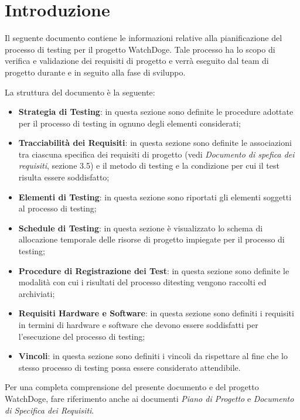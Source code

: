 \documentclass{article}
\begin{document}
\tableofcontents

\pagebreak
  
\section{Introduzione}

Il seguente documento contiene le informazioni relative alla
pianificazione del processo di testing per il progetto WatchDoge. Tale
processo ha lo scopo di verifica e validazione dei requisiti di progetto
e verrà eseguito dal team di progetto durante e in seguito alla fase di
sviluppo.

La struttura del documento è la seguente:
\begin{itemize}
\item \textbf{Strategia di Testing}: in questa sezione sono definite le procedure adottate per il processo di testing in ognuno degli elementi considerati;
\item \textbf{Tracciabilità dei Requisiti}: in questa sezione sono definite le associazioni tra ciascuna specifica dei requisiti di progetto (vedi \emph{Documento di spefica dei requisiti}, sezione 3.5) e il metodo di testing e la condizione per cui il test risulta essere soddisfatto;
\item \textbf{Elementi di Testing}: in questa sezione sono riportati gli elementi soggetti al processo di testing;
\item \textbf{Schedule di Testing}: in questa sezione è visualizzato lo schema di allocazione temporale delle risorse di progetto impiegate per il processo di testing;
\item \textbf{Procedure di Registrazione dei Test}: in questa sezione sono definite le modalità con cui i risultati del processo ditesting vengono raccolti ed archiviati;
\item \textbf{Requisiti Hardware e Software}: in questa sezione sono definiti i requisiti in termini di hardware e software che devono essere soddisfatti per l'esecuzione del processo di testing;
\item \textbf{Vincoli}: in questa sezione sono definiti i vincoli da rispettare al fine che lo stesso processo di testing possa essere considerato attendibile.
\end{itemize}

Per una completa comprensione del presente documento e del progetto
WatchDoge, fare riferimento anche ai documenti \emph{Piano di Progetto}
e \emph{Documento di Specifica dei Requisiti}.
\end{document}
